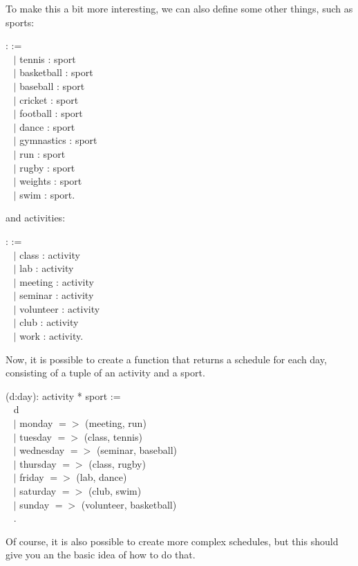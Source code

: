 \noindent
To make this a bit more interesting, we can also define some other things, such as sports:

\begin{code}
\Inductive {}: \Type :=		\\ \-\ \quad
  $\mid$ tennis : sport			\\ \-\ \quad
  $\mid$ basketball : sport			\\ \-\ \quad
  $\mid$ baseball : sport 			\\ \-\ \quad
  $\mid$ cricket : sport			\\ \-\ \quad
  $\mid$ football : sport			\\ \-\ \quad
  $\mid$ dance : sport			\\ \-\ \quad
  $\mid$ gymnastics : sport		\\ \-\ \quad
  $\mid$ run : sport				\\ \-\ \quad
  $\mid$ rugby : sport			\\ \-\ \quad
  $\mid$ weights : sport			\\ \-\ \quad
  $\mid$ swim : sport.
\end{code}

and activities: 

\begin{code}
\Inductive {}: \Type :=	\\ \-\ \quad
  $\mid$ class : activity			\\ \-\ \quad
  $\mid$ lab : activity				\\ \-\ \quad
  $\mid$ meeting : activity			\\ \-\ \quad
  $\mid$ seminar : activity			\\ \-\ \quad
  $\mid$ volunteer : activity		\\ \-\ \quad
  $\mid$ club : activity			\\ \-\ \quad
  $\mid$ work : activity.	
\end{code}

\noindent
Now, it is possible to create a function that returns a schedule for each day, 
consisting of a tuple of an activity and a sport. 

\begin{code}
\Definition {} (d:day): activity * sport :=		\\ \-\ \quad
  \match d \with										\\ \-\ \qquad
   $\mid$ monday $=>$ (meeting, run)					\\ \-\ \qquad
   $\mid$ tuesday $=>$ (class, tennis)					\\ \-\ \qquad
   $\mid$ wednesday $=>$ (seminar, baseball)				\\ \-\ \qquad
   $\mid$ thursday $=>$ (class, rugby)					\\ \-\ \qquad
   $\mid$ friday $=>$ (lab, dance)						\\ \-\ \qquad
   $\mid$ saturday $=>$ (club, swim)						\\ \-\ \qquad
   $\mid$ sunday $=>$ (volunteer, basketball)				\\ \-\ \quad
  \End.	
\end{code}

\noindent
Of course, it is also possible to create more complex schedules, but this 
should give you an the basic idea of how to do that. 








